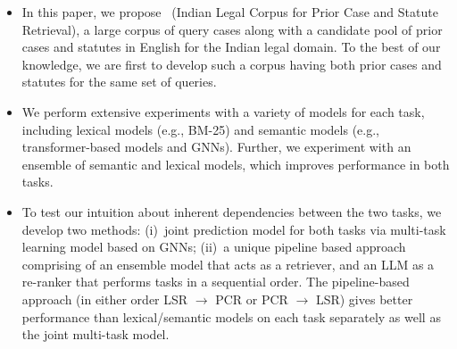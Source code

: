 \begin{itemize}[noitemsep,nosep,leftmargin=*]
\item  In this paper, we propose \ilpcsr\ (Indian Legal Corpus for Prior Case and Statute Retrieval), a large corpus of query cases along with a candidate pool of prior cases and statutes in English for the Indian legal domain. To the best of our knowledge, we are first to develop such a corpus having both prior cases and statutes for the same set of queries. 
\item We perform extensive experiments with a variety of models for  each task, including lexical models (e.g., BM-25) and semantic models (e.g., transformer-based models and GNNs). Further, we experiment with an ensemble of semantic and lexical models, which improves performance in both tasks.
\item To test our intuition about inherent dependencies between the two tasks, we develop two methods: 
(i)~joint prediction model for both tasks via multi-task learning model based on GNNs; 
(ii)~a unique pipeline based approach comprising of an ensemble model that acts as a retriever, and an LLM as a re-ranker that performs tasks in a sequential order. The pipeline-based approach (in either order LSR $\rightarrow$ PCR or PCR $\rightarrow$ LSR) gives better performance than lexical/semantic models on each task separately as well as the joint multi-task model.


\end{itemize}
